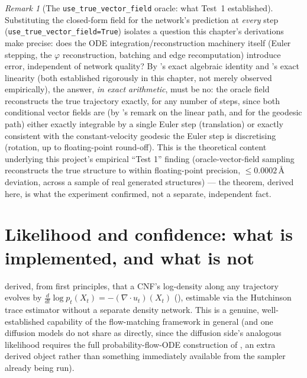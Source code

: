 \documentclass[11pt,a4paper]{report}
\theoremstyle{definition}
\theoremstyle{remark}
\newtheorem{remark}[remark]{Remark}
\begin{document}
\begin{remark}[The \texttt{use\_true\_vector\_field} oracle: what Test~1 established]
\label{rem:oracle-test-recap}
Substituting the closed-form field for the network's prediction at
\emph{every} step (\texttt{use\_true\_vector\_field=True}) isolates a
question this chapter's derivations make precise: does the ODE
integration/reconstruction machinery itself (Euler stepping, the
$\varphi$ reconstruction, batching and edge recomputation) introduce error,
independent of network quality? By 's exact
algebraic identity and 's exact linearity
(both established rigorously in this chapter, not merely observed
empirically), the answer, \emph{in exact arithmetic}, must be no: the
oracle field reconstructs the true trajectory exactly, for any number of
steps, since both conditional vector fields are (by
's remark on the linear path, and
 for the geodesic path) either exactly
integrable by a single Euler step (translation) or exactly consistent with
the constant-velocity geodesic the Euler step is discretising (rotation,
up to floating-point round-off). This is the theoretical content
underlying this project's empirical ``Test 1'' finding (oracle-vector-field
sampling reconstructs the true structure to within floating-point
precision, $\le0.0002$\,\r A deviation, across a sample of real generated
structures) --- the theorem, derived here, is what the experiment
confirmed, not a separate, independent fact.
\end{remark}

\section{Likelihood and confidence: what is implemented, and what is not}
\label{sec:likelihood-confidence}

 derived, from first principles, that a CNF's
log-density along any trajectory evolves by
$\frac{d}{dt}\log p_t(X_t) = -(\nabla\cdot u_t)(X_t)$
(), estimable via the Hutchinson trace
estimator without a separate density network. This is a genuine,
well-established capability of the flow-matching framework in general (and
one diffusion models do not share as directly, since the diffusion
side's analogous likelihood requires the full probability-flow-ODE
construction of , an extra derived object rather
than something immediately available from the sampler already being run).
\end{document}
